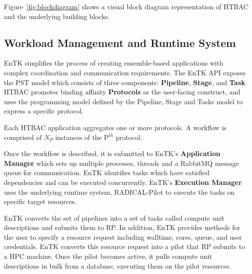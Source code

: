 Figure~\ref{fig:blockdiagram} shows a visual block diagram representation of 
HTBAC and the underlying building blocks. 

\subsection{Workload Management and Runtime System}

EnTK simplifies the process of creating ensemble-based applications with
complex coordination and communication requirements. The EnTK API exposes the
PST model which consists of three components: \textbf{Pipeline},
\textbf{Stage}, and \textbf{Task}. HTBAC promotes binding affinity {\bf
Protocols} as the user-facing construct, and uses the programming model
defined by the Pipeline, Stage and Tasks model to express a specific
protocol. 

Each HTBAC application aggregates one or more protocols. A workflow is comprised 
of $N_P$ instances of the P$^{th}$ protocol. 




Once the workflow is described, it is submitted to EnTK's
\textbf{Application Manager} which sets up multiple processes, threads and a
RabbitMQ message queue for communication.
EnTK identifies tasks which have satisfied dependencies and can be executed
concurrently. EnTK's \textbf{Execution Manager} uses the underlying runtime
system, RADICAL-Pilot to execute the tasks on specific target resources.

EnTK converts the set of pipelines into a set of tasks called compute unit 
descriptions and submits them to RP. In addition, EnTK provides methods for the 
user to specify a resource request including walltime, cores, queue, and user 
credentials. EnTK converts this resource request into a pilot that RP submits to 
a HPC machine. Once the pilot becomes active, it pulls compute unit descriptions 
in bulk from a database, executing them on the pilot resources. 

